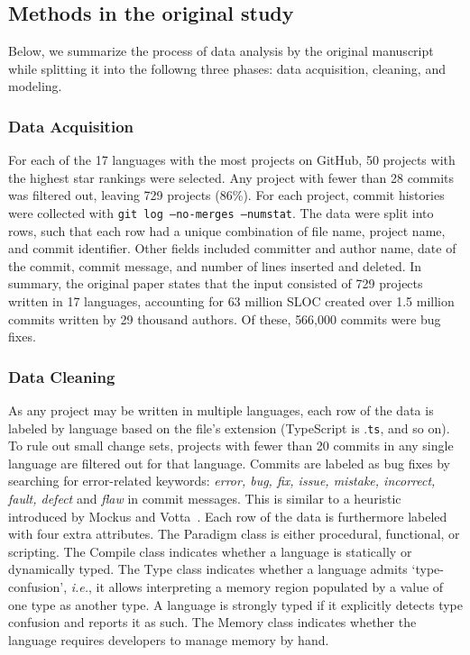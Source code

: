 \documentclass[acmsmall]{acmart}
\newcommand{\ts}{{\sf  TypeScript}\xspace}
\newcommand{\gh}{{GitHub}\xspace}
\newcommand{\code}[1]{{\tt\small #1}\xspace}
\newcommand{\ie}{\emph{i.e.}\xspace}
\begin{document}
\subsection{Methods in the original study}

Below, we summarize the process of data analysis by the original manuscript
while splitting it into the followng three phases: data acquisition,
cleaning, and modeling.

\renewcommand{\SS}{\hspace{-.7mm}} 

\subsubsection{Data Acquisition}

For each of the 17 languages with the most projects on \gh, 50 projects with
the highest star rankings were selected.  Any project with fewer than 28
commits was filtered out, leaving 729 projects (86\%).  For each project,
commit histories were collected with {\tt git log --no-merges
  --numstat}. The data were split into rows, such that each row had a unique
combination of file name, project name, and commit identifier.  Other fields
included committer and author name, date of the commit, commit message, and
number of lines inserted and deleted.  In summary, the original paper states
that the input consisted of {729} projects written in {17} languages,
accounting for {63} million SLOC created over {1.5} million commits written
by {29} thousand authors. Of these, {566,000} commits were bug fixes.
  
\subsubsection{Data Cleaning}

As any project may be written in multiple languages, each row of the data is
labeled by language based on the file's extension (\ts is .\code{ts}, and so
on).  To rule out small change sets, projects with fewer than 20 commits in
any single language are filtered out for that language. Commits are labeled
as bug fixes by searching for error-related keywords: \emph{error, bug, fix,
  issue, mistake, incorrect, fault, defect} and \emph{flaw} in commit
messages. This is similar to a heuristic introduced by Mockus and
Votta~\cite{Mockus00}.  Each row of the data is furthermore labeled with
four extra attributes.  The {Paradigm} class is either procedural,
functional, or scripting. The {Compile} class indicates whether a language
is statically or dynamically typed. The {Type} class indicates whether a
language admits `type-confusion', \ie, it allows interpreting a memory
region populated by a value of one type as another type. A language is
strongly typed if it explicitly detects type confusion and reports it as
such. The {Memory} class indicates whether the language requires developers
to manage memory by hand.
\end{document}
